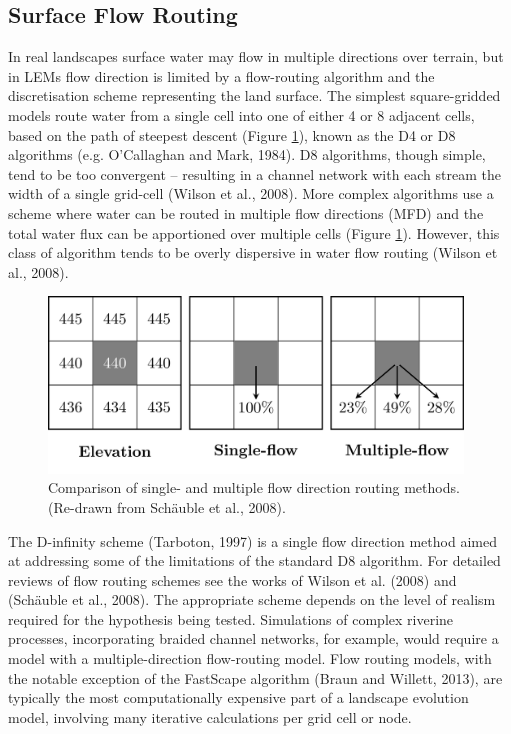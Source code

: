\subsection{Surface Flow Routing}
In real landscapes surface water may flow in multiple directions over terrain, but in LEMs flow direction is limited by a flow-routing algorithm and the discretisation scheme representing the land surface. The simplest square-gridded models route water from a single cell into one of either 4 or 8 adjacent cells, based on the path of steepest descent (Figure \ref{fig_LEM_flow_routing}), known as the D4 or D8 algorithms (e.g. O'Callaghan and Mark, 1984). D8 algorithms, though simple, tend to be too convergent – resulting in a channel network with each stream the width of a single grid-cell (Wilson et al., 2008). More complex algorithms use a scheme where water can be routed in multiple flow directions (MFD) and the total water flux can be apportioned over multiple cells (Figure \ref{fig_LEM_flow_routing}).  However, this class of algorithm tends to be overly dispersive in water flow routing (Wilson et al., 2008).  

\begin{figure}[t]
\includegraphics[width=11cm]{LEMFinalRevisedmanuscriptDAVFinalrevisions-img/LEMFinalRevisedmanuscriptDAVFinalrevisions-img006.png} 
\caption{Comparison of single- and multiple flow direction routing methods. (Re-drawn from Schäuble et al., 2008).}
\label{fig_LEM_flow_routing}
\end{figure}

The D-infinity scheme (Tarboton, 1997) is a single flow direction method aimed at addressing some of the limitations of the standard D8 algorithm. For detailed reviews of flow routing schemes see the works of Wilson et al. (2008) and (Schäuble et al., 2008). The appropriate scheme depends on the level of realism required for the hypothesis being tested. Simulations of complex riverine processes, incorporating braided channel networks, for example, would require a model with a multiple-direction flow-routing model.\- Flow routing models, with the notable exception of the FastScape algorithm (Braun and Willett, 2013), are typically the most computationally expensive part of a landscape evolution model, involving many iterative calculations per grid cell or node.

